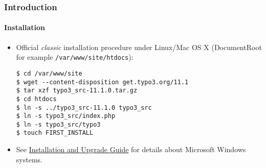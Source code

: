 %

\begin{frame}[fragile]
	\frametitle{Introduction}
	\framesubtitle{Installation}


	\begin{itemize}
		\item Official \textit{classic} installation procedure under Linux/Mac OS X\newline
			(DocumentRoot for example \texttt{/var/www/site/htdocs}):
\begin{lstlisting}
$ cd /var/www/site
$ wget --content-disposition get.typo3.org/11.1
$ tar xzf typo3_src-11.1.0.tar.gz
$ cd htdocs
$ ln -s ../typo3_src-11.1.0 typo3_src
$ ln -s typo3_src/index.php
$ ln -s typo3_src/typo3
$ touch FIRST_INSTALL
\end{lstlisting}

		\item See \href{https://docs.typo3.org/m/typo3/guide-installation/master/en-us/}{Installation and Upgrade Guide}
			for details about Microsoft Windows systems.

	\end{itemize}
\end{frame}

